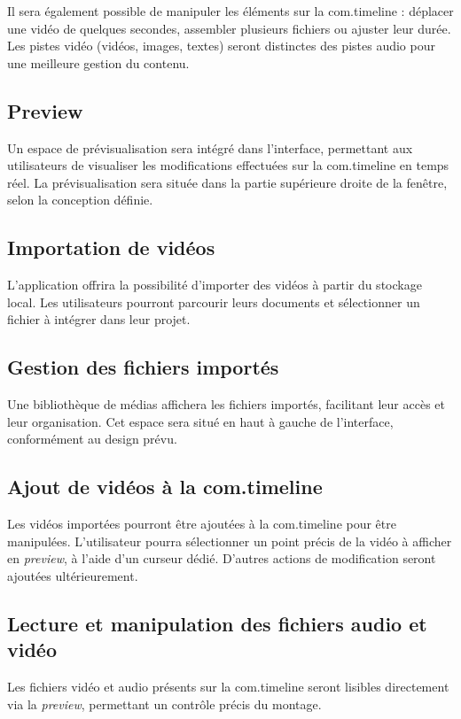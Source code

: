 \documentclass{rapport}
\begin{document}
Il sera également possible de manipuler les éléments sur la com.timeline : déplacer une vidéo de quelques secondes, assembler plusieurs fichiers ou ajuster leur durée. Les pistes vidéo (vidéos, images, textes) seront distinctes des pistes audio pour une meilleure gestion du contenu.

\subsection{Preview}
Un espace de prévisualisation sera intégré dans l’interface, permettant aux utilisateurs de visualiser les modifications effectuées sur la com.timeline en temps réel. La prévisualisation sera située dans la partie supérieure droite de la fenêtre, selon la conception définie.

\subsection{Importation de vidéos}
L’application offrira la possibilité d’importer des vidéos à partir du stockage local. Les utilisateurs pourront parcourir leurs documents et sélectionner un fichier à intégrer dans leur projet.

\subsection{Gestion des fichiers importés}
Une bibliothèque de médias affichera les fichiers importés, facilitant leur accès et leur organisation. Cet espace sera situé en haut à gauche de l’interface, conformément au design prévu.

\subsection{Ajout de vidéos à la com.timeline}
Les vidéos importées pourront être ajoutées à la com.timeline pour être manipulées. L’utilisateur pourra sélectionner un point précis de la vidéo à afficher en \textit{preview}, à l’aide d’un curseur dédié. D’autres actions de modification seront ajoutées ultérieurement.

\subsection{Lecture et manipulation des fichiers audio et vidéo}
Les fichiers vidéo et audio présents sur la com.timeline seront lisibles directement via la \textit{preview}, permettant un contrôle précis du montage.
\end{document}
